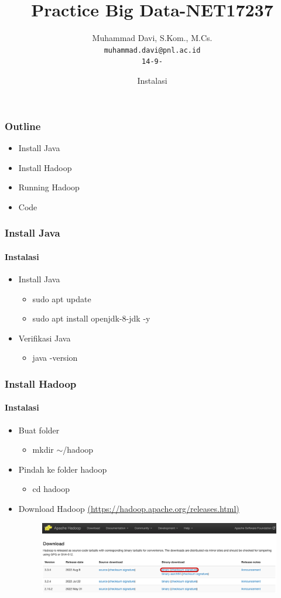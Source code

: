 \documentclass{beamer}
\title{Practice Big Data-NET17237}
\date[8-9-2022]{Instalasi}
\author[Davi]{Muhammad Davi, S.Kom., M.Cs.\\ 
\texttt{muhammad.davi@pnl.ac.id}\\ 
\texttt{\small 14-9-\the\year{}}}
\begin{document}
  
\newcommand\connect[2]{
	\draw[->,thick] (#1) -| (#2);
	\draw[->,thick] (#2) -| (#1);
}
  
\begin{frame}[t]
\titlepage
\end{frame}

\begin{frame}[t]
\frametitle{Outline}
\begin{itemize}
\item Install Java
\item Install Hadoop
\item Running Hadoop
\item Code
\end{itemize}
\end{frame}

\begin{frame}[t]
\frametitle{Install Java}
\framesubtitle{Instalasi}
\begin{itemize}
\item Install Java
\begin{itemize}
\item sudo apt update
\item sudo apt install openjdk-8-jdk -y
\end{itemize}
\item Verifikasi Java
\begin{itemize}
\item java -version
\end{itemize}
\end{itemize}
\end{frame}

\begin{frame}[t]
\frametitle{Install Hadoop}
\framesubtitle{Instalasi}
\begin{itemize}
\item Buat folder
\begin{itemize}
\item mkdir $\sim$/hadoop
\end{itemize}
\item Pindah ke folder hadoop
\begin{itemize}
\item cd hadoop
\end{itemize}
\item Download Hadoop \href{https://hadoop.apache.org/releases.html}{(https://hadoop.apache.org/releases.html)}
\begin{figure}
\includegraphics[scale=.25]{download-hadoop-1.png}
\end{figure}
\end{itemize}
\end{frame}
\end{document}
